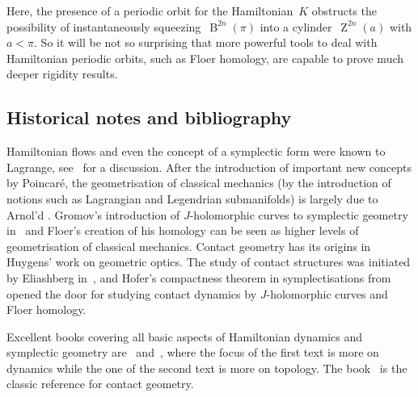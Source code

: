 \documentclass[12pt,twoside]{amsart}
\theoremstyle{plain}
\numberwithin{figure}{section}
\numberwithin{equation}{section}
\def\B{\operatorname{B}}
\def\Z{\operatorname{Z}}
\begin{document}
Here, the presence of a periodic orbit for the Hamiltonian~$K$ obstructs the possibility of instantaneously squeezing~$\B^{2n}(\pi)$ into a cylinder~$\Z^{2n}(a)$ with $a<\pi$. 
So it will be not so surprising that more powerful tools to deal with Hamiltonian periodic orbits, such as Floer homology, 
are capable to prove much deeper rigidity results. 


\subsection*{Historical notes and bibliography}
Hamiltonian flows and even the concept of a symplectic form were known to Lagrange, 
see~\cite{Alb13} for a discussion.
After the introduction of important new concepts by Poincar\'e, 
the geometrisation of classical mechanics 
(by the introduction of notions such as Lagrangian and Legendrian submanifolds) 
is largely due to Arnol'd \cite{Arn78,AG85}.
%
Gromov's introduction of $J$-holomorphic curves to symplectic geometry in~\cite{Gro85}
and Floer's creation of his homology 
can be seen as higher levels of geometrisation 
of classical mechanics.
%
Contact geometry has its origins in Huygens' work on geometric optics.
The study of contact structures was initiated by Eliashberg in~\cite{El89},
and Hofer's compactness theorem in symplectisations from~\cite{Ho93} 
opened the door for studying contact dynamics by $J$-holomorphic curves and Floer homology.

Excellent books covering all basic aspects of Hamiltonian dynamics and symplectic geometry
are~\cite{HoZe94} and~\cite{McSa15},
where the focus of the first text is more on dynamics while the one of the second text
is more on topology.
The book~\cite{Gei08} is the classic reference for contact geometry.
\end{document}
